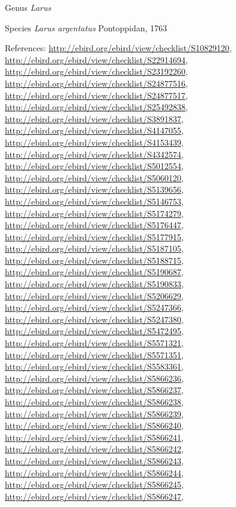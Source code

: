 \documentclass[9pt, article]{memoir}
\begin{document}
\begin{multicols}{2}
\vspace{6pt}\noindent\hspace{30pt}Genus \textit{Larus}


\vspace{6pt}\noindent\hspace{36pt}Species \textit{Larus argentatus} Pontoppidan, 1763


\vspace{6pt}References: 
\url{http://ebird.org/ebird/view/checklist/S10829120}, 
\url{http://ebird.org/ebird/view/checklist/S22914694}, 
\url{http://ebird.org/ebird/view/checklist/S23192260}, 
\url{http://ebird.org/ebird/view/checklist/S24877516}, 
\url{http://ebird.org/ebird/view/checklist/S24877517}, 
\url{http://ebird.org/ebird/view/checklist/S25492838}, 
\url{http://ebird.org/ebird/view/checklist/S3891837}, 
\url{http://ebird.org/ebird/view/checklist/S4147055}, 
\url{http://ebird.org/ebird/view/checklist/S4153439}, 
\url{http://ebird.org/ebird/view/checklist/S4342574}, 
\url{http://ebird.org/ebird/view/checklist/S5012554}, 
\url{http://ebird.org/ebird/view/checklist/S5060120}, 
\url{http://ebird.org/ebird/view/checklist/S5139656}, 
\url{http://ebird.org/ebird/view/checklist/S5146753}, 
\url{http://ebird.org/ebird/view/checklist/S5174279}, 
\url{http://ebird.org/ebird/view/checklist/S5176447}, 
\url{http://ebird.org/ebird/view/checklist/S5177915}, 
\url{http://ebird.org/ebird/view/checklist/S5187105}, 
\url{http://ebird.org/ebird/view/checklist/S5188715}, 
\url{http://ebird.org/ebird/view/checklist/S5190687}, 
\url{http://ebird.org/ebird/view/checklist/S5190833}, 
\url{http://ebird.org/ebird/view/checklist/S5206629}, 
\url{http://ebird.org/ebird/view/checklist/S5247366}, 
\url{http://ebird.org/ebird/view/checklist/S5247380}, 
\url{http://ebird.org/ebird/view/checklist/S5472495}, 
\url{http://ebird.org/ebird/view/checklist/S5571321}, 
\url{http://ebird.org/ebird/view/checklist/S5571351}, 
\url{http://ebird.org/ebird/view/checklist/S5583361}, 
\url{http://ebird.org/ebird/view/checklist/S5866236}, 
\url{http://ebird.org/ebird/view/checklist/S5866237}, 
\url{http://ebird.org/ebird/view/checklist/S5866238}, 
\url{http://ebird.org/ebird/view/checklist/S5866239}, 
\url{http://ebird.org/ebird/view/checklist/S5866240}, 
\url{http://ebird.org/ebird/view/checklist/S5866241}, 
\url{http://ebird.org/ebird/view/checklist/S5866242}, 
\url{http://ebird.org/ebird/view/checklist/S5866243}, 
\url{http://ebird.org/ebird/view/checklist/S5866244}, 
\url{http://ebird.org/ebird/view/checklist/S5866245}, 
\url{http://ebird.org/ebird/view/checklist/S5866247}, 

\end{multicols}
\end{document}
